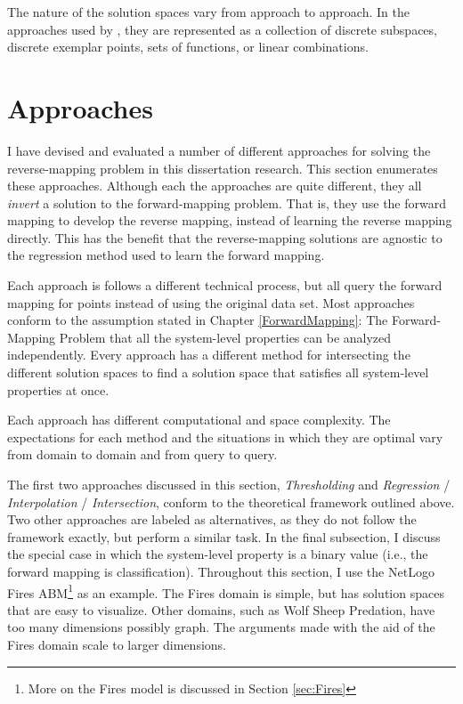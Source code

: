 The nature of the solution spaces vary from approach to approach.
In the approaches used by \fw, they are represented as a collection of discrete subspaces, discrete exemplar points, sets of functions, or linear combinations.

\section{Approaches}

I have devised and evaluated a number of different approaches for solving the reverse-mapping problem in this dissertation research.
This section enumerates these approaches.
Although each the approaches are quite different, they all \textit{invert} a solution to the forward-mapping problem.
That is, they use the forward mapping to develop the reverse mapping, instead of learning the reverse mapping directly.
This has the benefit that the reverse-mapping solutions are agnostic to the regression method used to learn the forward mapping.

Each approach is follows a different technical process, but all query the forward mapping for points instead of using the original data set.
Most approaches conform to the assumption stated in Chapter \ref{ForwardMapping}: The Forward-Mapping Problem that all the system-level properties can be analyzed independently.
Every approach has a different method for intersecting the different solution spaces to find a solution space that satisfies all system-level properties at once.

Each approach has different computational and space complexity.
The expectations for each method and the situations in which they are optimal vary from domain to domain and from query to query.

The first two approaches discussed in this section, \textit{Thresholding} and \textit{Regression} / \textit{Interpolation} / \textit{Intersection}, conform to the theoretical framework outlined above.
Two other approaches are labeled as alternatives, as they do not follow the framework exactly, but perform a similar task.
In the final subsection, I discuss the special case in which the system-level property is a binary value (i.e., the forward mapping is classification).
Throughout this section, I use the NetLogo Fires ABM\footnote{More on the Fires model is discussed in Section \ref{sec:Fires}} as an example.
The Fires domain is simple, but has solution spaces that are easy to visualize.
Other domains, such as Wolf Sheep Predation, have too many dimensions possibly graph.
The arguments made with the aid of the Fires domain scale to larger dimensions.


